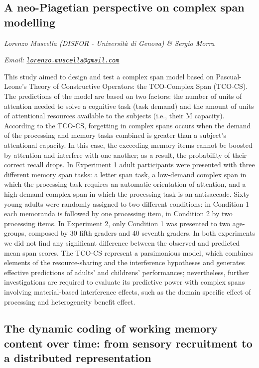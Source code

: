 \documentclass[
  12pt,
]{book}
\begin{document}
\hypertarget{a-neo-piagetian-perspective-on-complex-span-modelling}{%
\subsection{A neo-Piagetian perspective on complex span modelling}\label{a-neo-piagetian-perspective-on-complex-span-modelling}}

\emph{Lorenzo Muscella (DISFOR - Università di Genova) \& Sergio Morra}

\emph{Email: \href{mailto:lorenzo.muscella@gmail.com}{\nolinkurl{lorenzo.muscella@gmail.com}}}

This study aimed to design and test a complex span model based on Pascual-Leone's Theory of Constructive Operators: the TCO-Complex Span (TCO-CS). The predictions of the model are based on two factors: the number of units of attention needed to solve a cognitive task (task demand) and the amount of units of attentional resources available to the subjects (i.e., their M capacity). According to the TCO-CS, forgetting in complex spans occurs when the demand of the processing and memory tasks combined is greater than a subject's attentional capacity. In this case, the exceeding memory items cannot be boosted by attention and interfere with one another; as a result, the probability of their correct recall drops. In Experiment 1 adult participants were presented with three different memory span tasks: a letter span task, a low-demand complex span in which the processing task requires an automatic orientation of attention, and a high-demand complex span in which the processing task is an antisaccade. Sixty young adults were randomly assigned to two different conditions: in Condition 1 each memoranda is followed by one processing item, in Condition 2 by two processing items. In Experiment 2, only Condition 1 was presented to two age-groups, composed by 30 fifth graders and 40 seventh graders. In both experiments we did not find any significant difference between the observed and predicted mean span scores. The TCO-CS represent a parsimonious model, which combines elements of the resource-sharing and the interference hypotheses and generates effective predictions of adults' and childrens' performances; nevertheless, further investigations are required to evaluate its predictive power with complex spans involving material-based interference effects, such as the domain specific effect of processing and heterogeneity benefit effect.

\hypertarget{the-dynamic-coding-of-working-memory-content-over-time-from-sensory-recruitment-to-a-distributed-representation}{%
\subsection{The dynamic coding of working memory content over time: from sensory recruitment to a distributed representation}\label{the-dynamic-coding-of-working-memory-content-over-time-from-sensory-recruitment-to-a-distributed-representation}}
\end{document}

